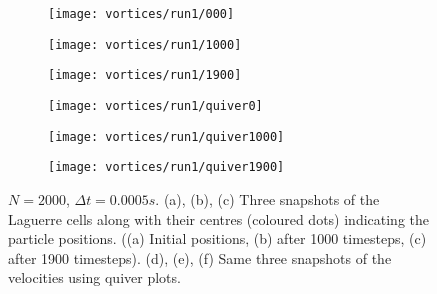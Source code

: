 \documentclass{imposter}
\newcommand{\dt}{\Delta t}
\begin{document}
{\begin{figure}[H]
   \begin{subfigure}[t]{0.25\textwidth}
        \centering
        \texttt{[image: vortices/run1/000]}
        \caption{} \label{fig:vortices-000}
    \end{subfigure}
   \begin{subfigure}[t]{0.25\textwidth}
        \centering
	\texttt{[image: vortices/run1/1000]}
        \caption{} \label{fig:vortices-1000}
    \end{subfigure}
   \begin{subfigure}[t]{0.25\textwidth}
        \centering
	\texttt{[image: vortices/run1/1900]}
        \caption{} \label{fig:vortices-1900}
    \end{subfigure}
   \begin{subfigure}[t]{0.25\textwidth}
        \centering
        \texttt{[image: vortices/run1/quiver0]}
        \caption{} \label{fig:vortices-quiver0}
    \end{subfigure}
   \begin{subfigure}[t]{0.25\textwidth}
        \centering
        \texttt{[image: vortices/run1/quiver1000]}
        \caption{} \label{fig:vortices-quiver1000}
    \end{subfigure}
   \begin{subfigure}[t]{0.25\textwidth}
        \centering
        \texttt{[image: vortices/run1/quiver1900]}
        \caption{} \label{fig:vortices-quiver1900}
    \end{subfigure}
\centering
\caption{\(N = 2000\), \(\dt = 0.0005s\). (a), (b), (c) Three snapshots of the Laguerre cells along with their centres (coloured dots) indicating the particle positions. ((a) Initial positions, (b) after 1000 timesteps, (c) after 1900 timesteps). (d), (e), (f) Same three snapshots of the velocities using quiver plots.}
\centering
\label{fig:vortices}
\end{figure}
         
    }
    
    
   

    
\end{document}
